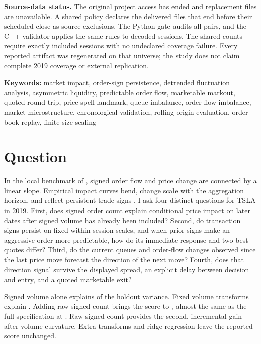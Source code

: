 \documentclass[11pt,a4paper]{article}
\begin{document}
\begin{center}
\begin{minipage}{0.92\textwidth}
\small
\textbf{Source-data status.} The original project access has ended and
replacement files are unavailable. A shared policy declares the
\CoverageExcludedSessions{} delivered files that end before their scheduled
close as source exclusions. The Python gate audits all \DeliveredSessions{}
pairs, and the C++ validator applies the same rules to decoded sessions. The
shared counts require exactly \Sessions{} included sessions with no undeclared
coverage failure. Every reported artifact was regenerated on that universe;
the study does not claim complete 2019 coverage or external replication.
\end{minipage}
\end{center}

\vspace{0.5em}
\textbf{Keywords:} market impact, order-sign persistence, detrended fluctuation
analysis, asymmetric liquidity, predictable order flow, marketable markout,
quoted round trip, price-spell landmark, queue imbalance, order-flow imbalance,
market microstructure, chronological validation, rolling-origin evaluation,
order-book replay, finite-size scaling

\section{Question}

In the local benchmark of \citet{kyle1985}, signed order flow and price change
are connected by a linear slope. Empirical impact curves bend, change scale with
the aggregation horizon, and reflect persistent trade signs
\citep{bouchaud2018,patzelt2018}. I ask four distinct questions for TSLA in
2019.
First, does signed order count explain conditional price impact on later dates
after signed volume has already been included? Second, do transaction signs
persist on fixed within-session scales, and when prior signs make an aggressive
order more predictable, how do its immediate response and two best quotes
differ? Third, do the current queues and order-flow changes observed since the
last price move forecast the direction of the next move? Fourth, does that
direction signal survive the displayed spread, an explicit delay between
decision and entry, and a quoted marketable exit?

Signed volume alone explains \BaselineRtwo{} of the holdout variance. Fixed
volume transforms explain \VolumeRtwo{}. Adding raw signed count brings the
score to \RawCountRtwo{}, almost the same as the full specification at
\AugmentedRtwo{}. Raw signed count provides the second, incremental gain after
volume curvature. Extra transforms and ridge regression leave the reported
score unchanged.
\end{document}
